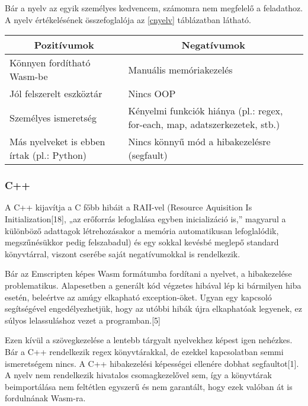 Bár a nyelv az egyik személyes kedvencem, számomra nem megfelelő a feladathoz. A nyelv értékelésének összefoglalója az \ref{cnyelv} táblázatban látható.

\begin{center}
  \begin{tabularx}{\textwidth}{X X}
    \hline
    \multicolumn{1}{c}{\bfseries{Pozitívumok}} & \multicolumn{1}{c}{\bfseries{Negatívumok}}                                  \\
    \hline
    Könnyen fordítható Wasm-be                 & Manuális memóriakezelés                                                     \\
    Jól felszerelt eszköztár                   & Nincs OOP                                                                   \\
    Személyes ismeretség                       & Kényelmi funkciók hiánya (pl.: regex, for-each, map, adatszerkezetek, stb.) \\
    Más nyelveket is ebben írtak (pl.: Python) & Nincs könnyű mód a hibakezelésre (segfault)                                 \\
    \hline
  \end{tabularx}
\end{center}

\subsubsection{C++}

A C++ kijavítja a C főbb hibáit a RAII-vel (Resource Aquisition Is Initialization[18], „az erőforrás lefoglalása egyben inicializáció is,” magyarul a különböző adattagok létrehozásakor a memória automatikusan lefoglalódik, megszűnésükkor pedig felszabadul) és egy sokkal kevésbé meglepő standard könyvtárral, viszont cserébe saját negatívumokkal is rendelkezik.

Bár az Emscripten képes Wasm formátumba fordítani a nyelvet, a hibakezelése problematikus. Alapesetben a generált kód végzetes hibával lép ki bármilyen hiba esetén, beleértve az amúgy elkapható exception-öket. Ugyan egy kapcsoló segítségével engedélyezhetjük, hogy az utóbbi hibák újra elkaphatóak legyenek, ez súlyos lelassuláshoz vezet a programban.[5]

Ezen kívül a szövegkezelése a lentebb tárgyalt nyelvekhez képest igen nehézkes. Bár a C++ rendelkezik regex könyvtárakkal, de ezekkel kapcsolatban semmi ismeretségem nincs. A C++ hibakezelési képességei ellenére dobhat segfaultot[1]. A nyelv nem rendelkezik hivatalos csomagkezelővel sem, így a könyvtárak beimportálása nem feltétlen egyszerű és nem garantált, hogy ezek valóban át is fordulnának Wasm-ra.

